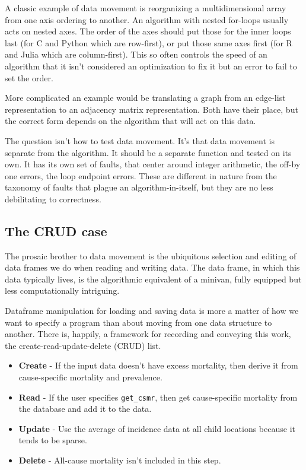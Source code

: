 \documentclass[fleqn,10pt]{olplainarticle}
\begin{document}
A classic example of data movement is reorganizing a multidimensional
array from one axis ordering to another. An algorithm with nested
for-loops usually acts on nested axes. The order of the axes should
put those for the inner loops last (for C and Python which are row-first), or put those
same axes first (for R and Julia which are column-first). This so
often controls the speed of an algorithm that it isn't considered an 
optimization to fix it but an error to fail to set the order.

More complicated an example would be translating a graph from
an edge-list representation to an adjacency matrix representation.
Both have their place, but the correct form depends on the
algorithm that will act on this data.

The question isn't how to test data movement. It's that data
movement is separate from the algorithm. It should be a separate
function and tested on its own. It has its own set of faults,
that center around integer arithmetic, the off-by one errors,
the loop endpoint errors. These are different in nature from
the taxonomy of faults that plague an algorithm-in-itself,
but they are no less debilitating to correctness.

\subsection{The CRUD case}\label{sec:crud}

The prosaic brother to data movement is the ubiquitous selection
and editing of data frames we do when reading and writing data.
The data frame, in which this data typically lives, is the
algorithmic equivalent of a minivan, fully equipped but less
computationally intriguing.

Dataframe manipulation for loading and saving data is more a matter
of how we want to specify a program than about moving from
one data structure to another. There is, happily, a framework
for recording and conveying this work, the create-read-update-delete
(CRUD) list.

\begin{itemize}
\item \textbf{Create} - If the input data doesn't have excess mortality,
  then derive it from cause-specific mortality and prevalence.
\item \textbf{Read} - If the user specifies \texttt{get\_csmr}, then get cause-specific
  mortality from the database and add it to the data.
\item \textbf{Update} - Use the average of incidence data at all child
  locations because it tends to be sparse.
\item \textbf{Delete} - All-cause mortality isn't included in this step.
\end{itemize}
\end{document}
